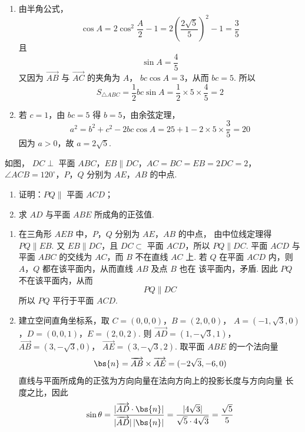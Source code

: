 \begin{solution}
\begin{enumerate}
\item 由半角公式，
\[
\cos A=2\cos^2\frac A2-1
=2\left(\frac{2\sqrt5}{5}\right)^2-1=\frac35
\]
且
\[
\sin A=\frac45
\]
又因为 \(\overrightarrow{AB}\) 与 \(\overrightarrow{AC}\) 的夹角为 \(A\)，
\(bc\cos A=3\)，从而 \(bc=5\).
所以
\[
S_{\triangle ABC}=\frac12bc\sin A
=\frac12\times5\times\frac45=2
\]
\item 若 \(c=1\)，由 \(bc=5\) 得 \(b=5\)，由余弦定理，
\[
a^2=b^2+c^2-2bc\cos A
=25+1-2\times5\times\frac35=20
\]
因为 \(a>0\)，故 \(a=2\sqrt5\).
\end{enumerate}
\end{solution}

\begin{problem}
如图， \(DC \perp\) 平面 \(ABC\)，\(EB \parallel DC\)，\(AC = BC = EB = 2DC = 2\)， \(\angle ACB = 120^{\circ}\)，\(P\)，\(Q\) 分别为 \(AE\)，\(AB\) 的中点.
\begin{enumerate}
\item 证明：\(PQ \parallel\) 平面 \(ACD\)；
\item 求 \(AD\) 与平面 \(ABE\) 所成角的正弦值.
\end{enumerate}

\end{problem}

\begin{solution}
\begin{enumerate}
\item 在三角形 \(AEB\) 中，\(P\)，\(Q\) 分别为 \(AE\)，\(AB\) 的中点，
由中位线定理得 \(PQ\parallel EB\). 又 \(EB\parallel DC\)，且
\(DC\subset\) 平面 \(ACD\)，所以 \(PQ\parallel DC\). 平面 \(ACD\) 与
平面 \(ABC\) 的交线为 \(AC\)，而 \(B\) 不在直线 \(AC\) 上. 若 \(Q\) 在平面
\(ACD\) 内，则 \(A\)，\(Q\) 都在该平面内，从而直线 \(AB\) 及点 \(B\) 也在
该平面内，矛盾. 因此 \(PQ\) 不在该平面内，从而
\[
PQ\parallel DC
\]
所以 \(PQ\) 平行于平面 \(ACD\).
\item 建立空间直角坐标系，取 \(C=(0,0,0)\)，\(B=(2,0,0)\)，
\(A=(-1,\sqrt3,0)\)，\(D=(0,0,1)\)，\(E=(2,0,2)\).
则 \(\overrightarrow{AD}=(1,-\sqrt3,1)\)，
\(\overrightarrow{AB}=(3,-\sqrt3,0)\)，
\(\overrightarrow{AE}=(3,-\sqrt3,2)\).
取平面 \(ABE\) 的一个法向量
\[
\bs{n}=\overrightarrow{AB}\times\overrightarrow{AE}
=(-2\sqrt3,-6,0)
\]
直线与平面所成角的正弦为方向向量在法向方向上的投影长度与方向向量
长度之比，因此
\[
\sin\theta
=\frac{|\overrightarrow{AD}\cdot\bs{n}|}
{|\overrightarrow{AD}|\,|\bs{n}|}
=\frac{|4\sqrt3|}{\sqrt5\cdot4\sqrt3}
=\frac{\sqrt5}{5}
\]
\end{enumerate}
\end{solution}

